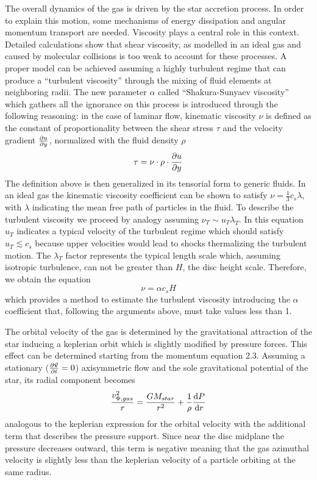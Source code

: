 \documentclass[a4paper,10pt]{report}
\begin{document}
The overall dynamics of the gas is driven by the star accretion process. In order to explain this motion, some mechanisms of energy dissipation and angular momentum transport
are needed. Viscosity plays a central role in this context. Detailed calculations show that shear viscosity, 
as modelled in an ideal gas and caused by molecular collisions is too weak to account for these processes. 
A proper model can be achieved assuming a highly turbulent regime that can produce a ``turbulent viscosity'' through the mixing of fluid elements
at neighboring radii. The new parameter $\alpha$
called ``Shakura-Sunyaev viscosity'' \cite{ssviscosity} which gathers all the ignorance on this process is introduced through the following reasoning:
in the case of laminar flow, kinematic viscosity $\nu$ is defined as the constant of 
proportionality between the shear stress $\tau$ and the velocity gradient  $\pdv{u}{y}$, normalized with the fluid density $\rho$
\begin{equation}
    \tau = \nu \cdot \rho \cdot \pdv{u}{y}
\end{equation}
The definition above is then generalized in its tensorial form to generic fluids.
In an ideal gas the kinematic viscosity coefficient can be shown to satisfy $\nu = \frac{1}{3}c_s\lambda$,
with $\lambda$ indicating the mean free path of particles in the fluid.
To describe the turbulent viscosity we proceed by analogy assuming $\nu_T \sim u_T \lambda_T$. In this equation $u_T$ indicates a typical velocity of the turbulent regime
which should 
satisfy $u_T \lesssim c_s$ because upper velocities would lead to shocks thermalizing the turbulent motion.
The $\lambda_T$ factor 
represents the typical length scale which, assuming isotropic turbulence, can not be greater than $H$, the disc height scale.
Therefore, we obtain the equation
\begin{equation}
    \nu = \alpha c_s H
\end{equation}
which provides a method to estimate the turbulent viscosity introducing the $\alpha$ coefficient that, following the arguments above,
must take values less than 1.

The orbital velocity of the gas is determined by the gravitational attraction of the 
star inducing a keplerian orbit which is slightly modified by pressure forces.
This effect can be determined starting from the momentum equation 2.3.
Assuming a stationary ($\pdv{\va v}{t}= 0$) axisymmetric flow and the sole gravitational potential of the star,
its radial component becomes
\begin{equation}
    \frac{v_{\Phi, gas}^2}{r} = \frac{GM_{star}}{r^2} + \frac 1 \rho \dv{P}{r}
\end{equation}
analogous to the keplerian expression for the orbital velocity with the additional
term that describes the pressure support.
Since near the disc midplane the pressure decreases outward, this term 
is negative meaning that the gas azimuthal velocity is slightly less than the keplerian velocity 
of a particle orbiting at the same radius.
\end{document}
